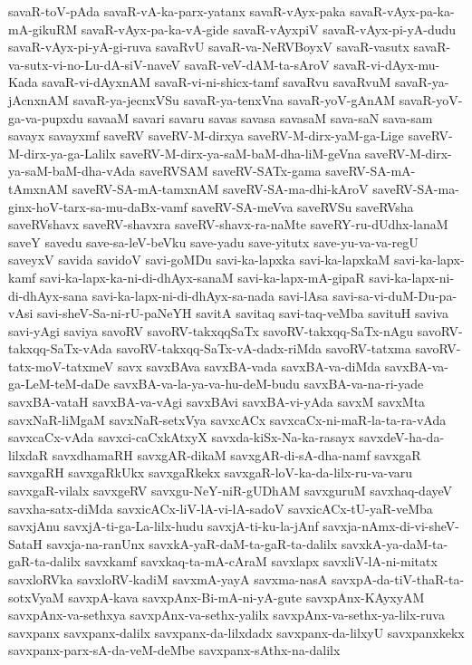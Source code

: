 {savaR-toV-pAda
savaR-vA-ka-parx-yatanx
savaR-vAyx-paka
savaR-vAyx-pa-ka-mA-gikuRM
savaR-vAyx-pa-ka-vA-gide
savaR-vAyxpiV
savaR-vAyx-pi-yA-dudu
savaR-vAyx-pi-yA-gi-ruva
savaRvU
savaR-va-NeRVBoyxV
savaR-vasutx
savaR-va-sutx-vi-no-Lu-dA-siV-naveV
savaR-veV-dAM-ta-sAroV
savaR-vi-dAyx-mu-Kada
savaR-vi-dAyxnAM
savaR-vi-ni-shicx-tamf
savaRvu
savaRvuM
savaR-ya-jAcnxnAM
savaR-ya-jecnxVSu
savaR-ya-tenxVna
savaR-yoV-gAnAM
savaR-yoV-ga-va-pupxdu
savaaM
savari
savaru
savas
savasa
savasaM
sava-saN
sava-sam
savayx
savayxmf
saveRV
saveRV-M-dirxya
saveRV-M-dirx-yaM-ga-Lige
saveRV-M-dirx-ya-ga-Lalilx
saveRV-M-dirx-ya-saM-baM-dha-liM-geVna
saveRV-M-dirx-ya-saM-baM-dha-vAda
saveRVSAM
saveRV-SATx-gama
saveRV-SA-mA-tAmxnAM
saveRV-SA-mA-tamxnAM
saveRV-SA-ma-dhi-kAroV
saveRV-SA-ma-ginx-hoV-tarx-sa-mu-daBx-vamf
saveRV-SA-meVva
saveRVSu
saveRVsha
saveRVshavx
saveRV-shavxra
saveRV-shavx-ra-naMte
saveRY-ru-dUdhx-lanaM
saveY
savedu
save-sa-leV-beVku
save-yadu
save-yitutx
save-yu-va-va-regU
saveyxV
savida
savidoV
savi-goMDu
savi-ka-lapxka
savi-ka-lapxkaM
savi-ka-lapx-kamf
savi-ka-lapx-ka-ni-di-dhAyx-sanaM
savi-ka-lapx-mA-gipaR
savi-ka-lapx-ni-di-dhAyx-sana
savi-ka-lapx-ni-di-dhAyx-sa-nada
savi-lAsa
savi-sa-vi-duM-Du-pa-vAsi
savi-sheV-Sa-ni-rU-paNeYH
savitA
savitaq
savi-taq-veMba
savituH
saviva
savi-yAgi
saviya
savoRV
savoRV-takxqqSaTx
savoRV-takxqq-SaTx-nAgu
savoRV-takxqq-SaTx-vAda
savoRV-takxqq-SaTx-vA-dadx-riMda
savoRV-tatxma
savoRV-tatx-moV-tatxmeV
savx
savxBAva
savxBA-vada
savxBA-va-diMda
savxBA-va-ga-LeM-teM-daDe
savxBA-va-la-ya-va-hu-deM-budu
savxBA-va-na-ri-yade
savxBA-vataH
savxBA-va-vAgi
savxBAvi
savxBA-vi-yAda
savxM
savxMta
savxNaR-liMgaM
savxNaR-setxVya
savxcACx
savxcaCx-ni-maR-la-ta-ra-vAda
savxcaCx-vAda
savxci-caCxkAtxyX
savxda-kiSx-Na-ka-rasayx
savxdeV-ha-da-lilxdaR
savxdhamaRH
savxgAR-dikaM
savxgAR-di-sA-dha-namf
savxgaR
savxgaRH
savxgaRkUkx
savxgaRkekx
savxgaR-loV-ka-da-lilx-ru-va-varu
savxgaR-vilalx
savxgeRV
savxgu-NeY-niR-gUDhAM
savxguruM
savxhaq-dayeV
savxha-satx-diMda
savxicACx-liV-lA-vi-lA-sadoV
savxicACx-tU-yaR-veMba
savxjAnu
savxjA-ti-ga-La-lilx-hudu
savxjA-ti-ku-la-jAnf
savxja-nAmx-di-vi-sheV-SataH
savxja-na-ranUnx
savxkA-yaR-daM-ta-gaR-ta-dalilx
savxkA-ya-daM-ta-gaR-ta-dalilx
savxkamf
savxkaq-ta-mA-cAraM
savxlapx
savxliV-lA-ni-mitatx
savxloRVka
savxloRV-kadiM
savxmA-yayA
savxma-nasA
savxpA-da-tiV-thaR-ta-sotxVyaM
savxpA-kava
savxpAnx-Bi-mA-ni-yA-gute
savxpAnx-KAyxyAM
savxpAnx-va-sethxya
savxpAnx-va-sethx-yalilx
savxpAnx-va-sethx-ya-lilx-ruva
savxpanx
savxpanx-dalilx
savxpanx-da-lilxdadx
savxpanx-da-lilxyU
savxpanxkekx
savxpanx-parx-sA-da-veM-deMbe
savxpanx-sAthx-na-dalilx
}

